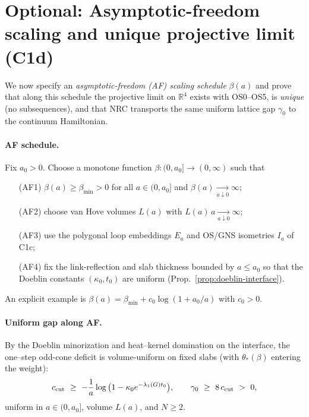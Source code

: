 \documentclass[11pt]{amsart}
\theoremstyle{plain}
\theoremstyle{definition}
\theoremstyle{remark}
\begin{document}
\section{Optional: Asymptotic-freedom scaling and unique projective limit (C1d)}

We now specify an \emph{asymptotic-freedom (AF) scaling schedule} $\beta(a)$ and prove that along this schedule the projective limit on $\mathbb R^4$ exists with OS0--OS5, is \emph{unique} (no subsequences), and that NRC transports the same uniform lattice gap $\gamma_0$ to the continuum Hamiltonian.

\paragraph{AF schedule.}
Fix $a_0>0$. Choose a monotone function $\beta:(0,a_0]\to (0,\infty)$ such that
\begin{itemize}
  \item[(AF1)] $\beta(a)\ge \beta_{\min}>0$ for all $a\in(0,a_0]$ and $\beta(a)\xrightarrow[a\downarrow 0]{}\infty$;
  \item[(AF2)] choose van Hove volumes $L(a)$ with $L(a)\,a\xrightarrow[a\downarrow 0]{}\infty$;
  \item[(AF3)] use the polygonal loop embeddings $E_a$ and OS/GNS isometries $I_a$ of C1c;
  \item[(AF4)] fix the link-reflection and slab thickness bounded by $a\le a_0$ so that the Doeblin constants $(\kappa_0,t_0)$ are uniform (Prop.~\ref{prop:doeblin-interface}).
\end{itemize}
An explicit example is $\beta(a)=\beta_{\min}+c_0\log(1+a_0/a)$ with $c_0>0$.
\paragraph{Uniform gap along AF.}
By the Doeblin minorization and heat--kernel domination on the interface, the one--step odd-cone deficit is volume-uniform on fixed slabs (with $\theta_*(\beta)$ entering the weight):
\[
  c_{\rm cut}\ \ge\ -\frac{1}{a}\log\big(1-\kappa_0 e^{-\lambda_1(G) t_0}\big),\qquad
  \gamma_0\ \ge\ 8\,c_{\mathrm{cut}}\ >\ 0,
\]
uniform in $a\in(0,a_0]$, volume $L(a)$, and $N\ge 2$.
\end{document}
